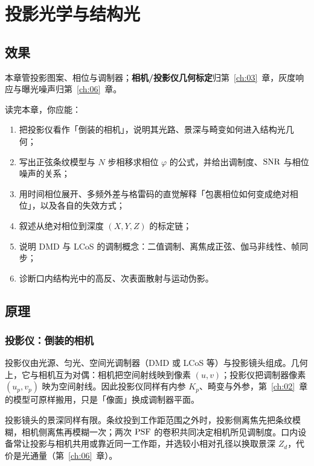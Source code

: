 \chapter{投影光学与结构光}
\label{ch:07}

\section{效果}

本章管投影图案、相位与调制器；\textbf{相机/投影仪几何标定}归第~\ref{ch:03}~章，灰度响应与曝光噪声归第~\ref{ch:06}~章。
\label{sec:ch06-effect}

读完本章，你应能：
\begin{enumerate}
  \item 把投影仪看作「倒装的相机」，说明其光路、景深与畸变如何进入结构光几何；
  \item 写出正弦条纹模型与 $N$ 步相移求相位 $\varphi$ 的公式，并给出调制度、$\mathrm{SNR}$ 与相位噪声的关系；
  \item 用时间相位展开、多频外差与格雷码的直觉解释「包裹相位如何变成绝对相位」，以及各自的失效方式；
  \item 叙述从绝对相位到深度 $(X,Y,Z)$ 的标定链；
  \item 说明 DMD 与 LCoS 的调制概念：二值调制、离焦成正弦、伽马非线性、帧同步；
  \item 诊断口内结构光中的高反、次表面散射与运动伪影。
\end{enumerate}

\section{原理}
\label{sec:ch06-principle}

\subsection{投影仪：倒装的相机}

投影仪由光源、匀光、空间光调制器（DMD 或 LCoS 等）与投影镜头组成。几何上，它与相机互为对偶：相机把空间射线映到像素 $(u,v)$；投影仪把调制器像素 $(u_p,v_p)$ 映为空间射线。因此投影仪同样有内参 $K_p$、畸变与外参，第~\ref{ch:02}~章的模型可原样搬用，只是「像面」换成调制器平面。

投影镜头的景深同样有限。条纹投到工作距范围之外时，投影侧离焦先把条纹模糊，相机侧离焦再模糊一次；两次 $\mathrm{PSF}$ 的卷积共同决定相机所见调制度。口内设备常让投影与相机共用或靠近同一工作距，并选较小相对孔径以换取景深 $Z_d$，代价是光通量（第~\ref{ch:06}~章）。

